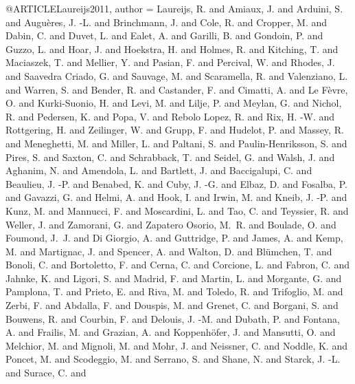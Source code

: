 \documentclass{aa}
\begin{document}
{{{{{{{{{{{{{{@ARTICLE{Laureijs2011,
       author = {{Laureijs}, R. and {Amiaux}, J. and {Arduini}, S. and
         {Augu{\`e}res}, J. -L. and {Brinchmann}, J. and {Cole}, R. and
         {Cropper}, M. and {Dabin}, C. and {Duvet}, L. and {Ealet}, A. and
         {Garilli}, B. and {Gondoin}, P. and {Guzzo}, L. and {Hoar}, J. and
         {Hoekstra}, H. and {Holmes}, R. and {Kitching}, T. and {Maciaszek}, T. and
         {Mellier}, Y. and {Pasian}, F. and {Percival}, W. and {Rhodes}, J. and
         {Saavedra Criado}, G. and {Sauvage}, M. and {Scaramella}, R. and
         {Valenziano}, L. and {Warren}, S. and {Bender}, R. and {Castander}, F. and
         {Cimatti}, A. and {Le F{\`e}vre}, O. and {Kurki-Suonio}, H. and
         {Levi}, M. and {Lilje}, P. and {Meylan}, G. and {Nichol}, R. and
         {Pedersen}, K. and {Popa}, V. and {Rebolo Lopez}, R. and {Rix}, H. -W. and
         {Rottgering}, H. and {Zeilinger}, W. and {Grupp}, F. and {Hudelot}, P. and
         {Massey}, R. and {Meneghetti}, M. and {Miller}, L. and {Paltani}, S. and
         {Paulin-Henriksson}, S. and {Pires}, S. and {Saxton}, C. and
         {Schrabback}, T. and {Seidel}, G. and {Walsh}, J. and {Aghanim}, N. and
         {Amendola}, L. and {Bartlett}, J. and {Baccigalupi}, C. and
         {Beaulieu}, J. -P. and {Benabed}, K. and {Cuby}, J. -G. and
         {Elbaz}, D. and {Fosalba}, P. and {Gavazzi}, G. and {Helmi}, A. and
         {Hook}, I. and {Irwin}, M. and {Kneib}, J. -P. and {Kunz}, M. and
         {Mannucci}, F. and {Moscardini}, L. and {Tao}, C. and {Teyssier}, R. and
         {Weller}, J. and {Zamorani}, G. and {Zapatero Osorio}, M.~R. and
         {Boulade}, O. and {Foumond}, J.~J. and {Di Giorgio}, A. and
         {Guttridge}, P. and {James}, A. and {Kemp}, M. and {Martignac}, J. and
         {Spencer}, A. and {Walton}, D. and {Bl{\"u}mchen}, T. and {Bonoli}, C. and
         {Bortoletto}, F. and {Cerna}, C. and {Corcione}, L. and {Fabron}, C. and
         {Jahnke}, K. and {Ligori}, S. and {Madrid}, F. and {Martin}, L. and
         {Morgante}, G. and {Pamplona}, T. and {Prieto}, E. and {Riva}, M. and
         {Toledo}, R. and {Trifoglio}, M. and {Zerbi}, F. and {Abdalla}, F. and
         {Douspis}, M. and {Grenet}, C. and {Borgani}, S. and {Bouwens}, R. and
         {Courbin}, F. and {Delouis}, J. -M. and {Dubath}, P. and {Fontana}, A. and
         {Frailis}, M. and {Grazian}, A. and {Koppenh{\"o}fer}, J. and
         {Mansutti}, O. and {Melchior}, M. and {Mignoli}, M. and {Mohr}, J. and
         {Neissner}, C. and {Noddle}, K. and {Poncet}, M. and {Scodeggio}, M. and
         {Serrano}, S. and {Shane}, N. and {Starck}, J. -L. and {Surace}, C. and
}}}}}}}}}}}}}}}}
\end{document}
